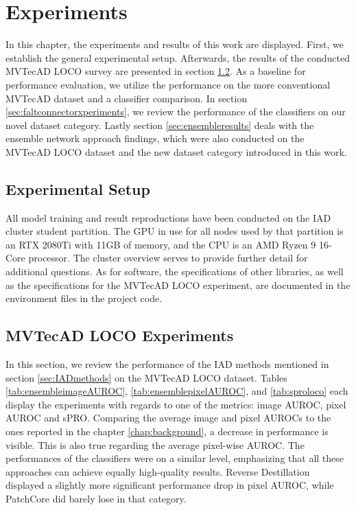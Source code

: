 \chapter{Experiments}
\label{chap:experiments}

In this chapter, the experiments and results of this work are displayed. First, we establish the general experimental setup. Afterwards, the results of the conducted MVTecAD LOCO \cite{LOCODentsAndScratchesBergmann2022}
survey are presented in section \ref{sec:locoxperiments}. As a baseline for performance evaluation, we utilize the performance on the more conventional MVTecAD dataset \cite{MVTEC_Bergmann_2021} and a classifier comparison. In section \ref{sec:faltconnectorxperiments}, we review the performance of the classifiers on our novel dataset category. Lastly section \ref{sec:ensembleresults} 
deals with the ensemble network approach findings, which were also conducted on the MVTecAD LOCO dataset and the new dataset category introduced in this work.


\section{Experimental Setup}
\label{sec:experimentsetup}

All model training and result reproductions have been conducted on the IAD cluster student partition. The GPU in use for all nodes used by that partition is an 
RTX 2080Ti with 11GB of memory, and the CPU is an AMD Ryzen 9 16-Core processor. The cluster overview \cite{clusterdocs} serves to provide further detail for additional questions. 
As for software, the specifications of other libraries, as well as the specifications for the MVTecAD LOCO experiment, are documented in the 
environment files in the project code.



\section{MVTecAD LOCO Experiments}
\label{sec:locoxperiments}

In this section, we review the performance of the IAD methods mentioned in section \ref{sec:IADmethods} on the MVTecAD LOCO \cite{LOCODentsAndScratchesBergmann2022} 
dataset. Tables \ref{tab:ensembleimageAUROC}, \ref{tab:ensemblepixelAUROC}, and \ref{tab:sproloco} each display the experiments with regards to one of the metrics: image AUROC, pixel AUROC and sPRO. \newline
Comparing the average image and pixel AUROCs to the ones reported in the chapter \ref{chap:background}, a decrease in performance is visible. 
This is also true regarding the average pixel-wise AUROC. The performances of the classifiers were on a similar level, emphasizing that all these approaches can achieve equally high-quality results. Reverse Destillation \cite{revdist2023} displayed a slightly more significant performance drop in pixel AUROC, while PatchCore \cite{patchCore2022} 
did barely lose in that category.

